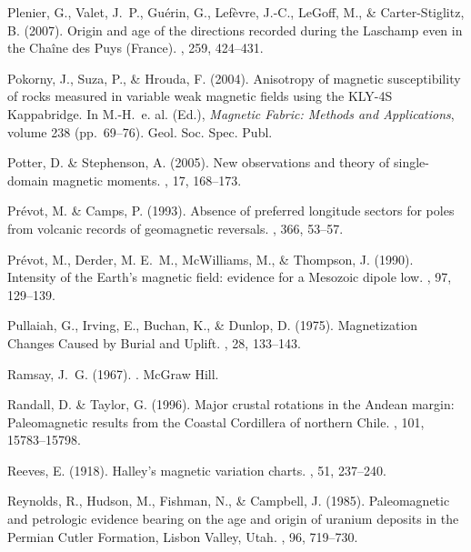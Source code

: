 Plenier, G., Valet, J.~P., Gu\'erin, G., Lef\`evre, J.-C., LeGoff, M., \&
  Carter-Stiglitz, B. (2007).
\newblock Origin and age of the directions recorded during the Laschamp even in
  the Cha\^ine des Puys (France).
, 259, 424--431.

Pokorny, J., Suza, P., \& Hrouda, F. (2004).
\newblock Anisotropy of magnetic susceptibility of rocks measured in variable
  weak magnetic fields using the KLY-4S Kappabridge.
\newblock In M.-H.~e. al. (Ed.), {\em Magnetic Fabric: Methods and
  Applications}, volume 238  (pp.\ 69--76). Geol. Soc. Spec. Publ.

Potter, D. \& Stephenson, A. (2005).
\newblock New observations and theory of single-domain magnetic moments.
, 17, 168--173.

Pr\'evot, M. \& Camps, P. (1993).
\newblock Absence of preferred longitude sectors for poles from volcanic
  records of geomagnetic reversals.
, 366, 53--57.

Pr\'evot, M., Derder, M. E.~M., McWilliams, M., \& Thompson, J. (1990).
\newblock Intensity of the Earth's magnetic field: evidence for a Mesozoic
  dipole low.
, 97, 129--139.

Pullaiah, G., Irving, E., Buchan, K., \& Dunlop, D. (1975).
\newblock Magnetization Changes Caused by Burial and Uplift.
, 28, 133--143.

Ramsay, J.~G. (1967).
.
\newblock McGraw Hill.

Randall, D. \& Taylor, G. (1996).
\newblock Major crustal rotations in the Andean margin: Paleomagnetic results
  from the Coastal Cordillera of northern Chile.
, 101, 15783--15798.

Reeves, E. (1918).
\newblock Halley's magnetic variation charts.
, 51, 237--240.

Reynolds, R., Hudson, M., Fishman, N., \& Campbell, J. (1985).
\newblock Paleomagnetic and petrologic evidence bearing on the age and origin
  of uranium deposits in the Permian Cutler Formation, Lisbon Valley, Utah.
, 96, 719--730.


